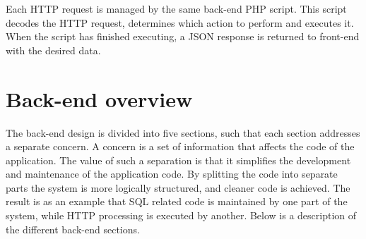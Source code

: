 Each HTTP request is managed by the same back-end PHP script. This script decodes the HTTP request, determines which action to perform and executes it. When the script has finished executing, a JSON response is returned to front-end with the desired data.

\section{Back-end overview}
The back-end design is divided into five sections, such that each section addresses a separate concern. A concern is a set of information that affects the code of the application. The value of such a separation is that it simplifies the development and maintenance of the application code. By splitting the code into separate parts the system is more logically structured, and cleaner code is achieved. The result is as an example that SQL related code is maintained by one part of the system, while HTTP processing is executed by another. Below is a description of the different back-end sections.

